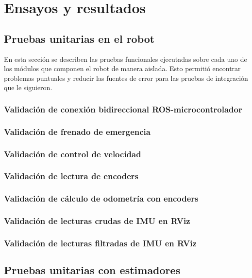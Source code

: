
\chapter{Ensayos y resultados} %

\label{Capitulo4}

\section{Pruebas unitarias en el robot}

En esta sección se describen las pruebas funcionales ejecutadas sobre cada uno de los módulos que componen el robot de manera aislada. Esto permitió encontrar problemas puntuales y reducir las fuentes de error para las pruebas de integración que le siguieron.

\subsection{Validación de conexión bidireccional ROS-microcontrolador}
\subsection{Validación de frenado de emergencia}
\subsection{Validación de control de velocidad}
\subsection{Validación de lectura de encoders}
\subsection{Validación de cálculo de odometría con encoders}
\subsection{Validación de lecturas crudas de IMU en RViz}
\subsection{Validación de lecturas filtradas de IMU en RViz}
\section{Pruebas unitarias con estimadores}
